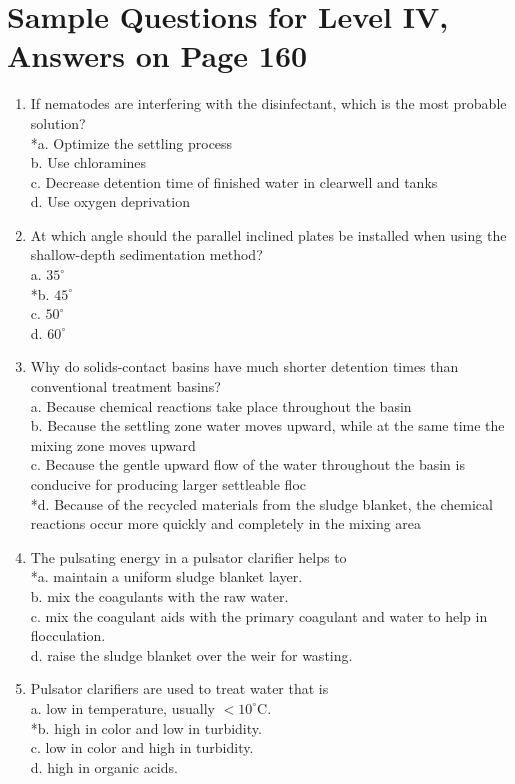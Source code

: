 \section{Sample Questions for Level IV, Answers on Page 160}
\begin{enumerate}[label=TIV-\arabic*]
\item If nematodes are interfering with the disinfectant, which is the most probable solution?\\
*a. Optimize the settling process\\
b. Use chloramines\\
c. Decrease detention time of finished water in clearwell and tanks\\
d. Use oxygen deprivation\\
\item At which angle should the parallel inclined plates be installed when using the shallow-depth sedimentation method?\\
a. $35^{\circ}$\\
*b. $45^{\circ}$\\
c. $50^{\circ}$\\
d. $60^{\circ}$\\
\item Why do solids-contact basins have much shorter detention times than conventional treatment basins?\\
a. Because chemical reactions take place throughout the basin\\
b. Because the settling zone water moves upward, while at the same time the mixing zone moves upward\\
c. Because the gentle upward flow of the water throughout the basin is conducive for producing larger settleable floc\\
*d. Because of the recycled materials from the sludge blanket, the chemical reactions occur more quickly and completely in the mixing area\\
\item The pulsating energy in a pulsator clarifier helps to\\
*a. maintain a uniform sludge blanket layer.\\
b. mix the coagulants with the raw water.\\
c. mix the coagulant aids with the primary coagulant and water to help in flocculation.\\
d. raise the sludge blanket over the weir for wasting.\\
\item Pulsator clarifiers are used to treat water that is\\
a. low in temperature, usually $<10^{\circ} \mathrm{C}$.\\
*b. high in color and low in turbidity.\\
c. low in color and high in turbidity.\\
d. high in organic acids.\\
\end{enumerate}
